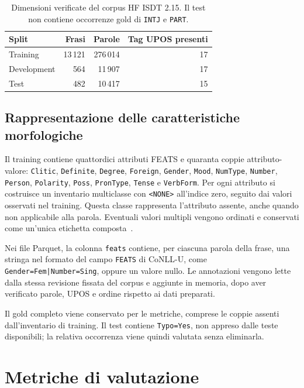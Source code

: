 \documentclass[12pt,a4paper]{report}
\begin{document}
\begin{table}[!htbp]
\centering
\begin{tabular}{lrrr}
\toprule
Split & Frasi & Parole & Tag UPOS presenti\\
\midrule
Training & 13\,121 & 276\,014 & 17\\
Development & 564 & 11\,907 & 17\\
Test & 482 & 10\,417 & 15\\
\bottomrule
\end{tabular}
\caption{Dimensioni verificate del corpus HF ISDT 2.15. Il test non contiene occorrenze gold di \texttt{INTJ} e \texttt{PART}.}
\label{tab:data}
\end{table}

\subsection{Rappresentazione delle caratteristiche morfologiche}
\label{sec:feats-representation}
Il training contiene quattordici attributi FEATS e quaranta coppie attributo-valore: \texttt{Clitic}, \texttt{Definite}, \texttt{Degree}, \texttt{Foreign}, \texttt{Gender}, \texttt{Mood}, \texttt{NumType}, \texttt{Number}, \texttt{Person}, \texttt{Polarity}, \texttt{Poss}, \texttt{PronType}, \texttt{Tense} e \texttt{VerbForm}. Per ogni attributo si costruisce un inventario multiclasse con \texttt{<NONE>} all'indice zero, seguito dai valori osservati nel training. Questa classe rappresenta l'attributo assente, anche quando non applicabile alla parola. Eventuali valori multipli vengono ordinati e conservati come un'unica etichetta composta~\cite{conllu}.

Nei file Parquet, la colonna \texttt{feats} contiene, per ciascuna parola della frase, una stringa nel formato del campo \texttt{FEATS} di CoNLL-U, come \texttt{Gender=Fem|Number=Sing}, oppure un valore nullo. Le annotazioni vengono lette dalla stessa revisione fissata del corpus e aggiunte in memoria, dopo aver verificato parole, UPOS e ordine rispetto ai dati preparati.

Il gold completo viene conservato per le metriche, comprese le coppie assenti dall'inventario di training. Il test contiene \texttt{Typo=Yes}, non appreso dalle teste disponibili; la relativa occorrenza viene quindi valutata senza eliminarla.

\section{Metriche di valutazione}
\label{sec:metrics}
\end{document}

